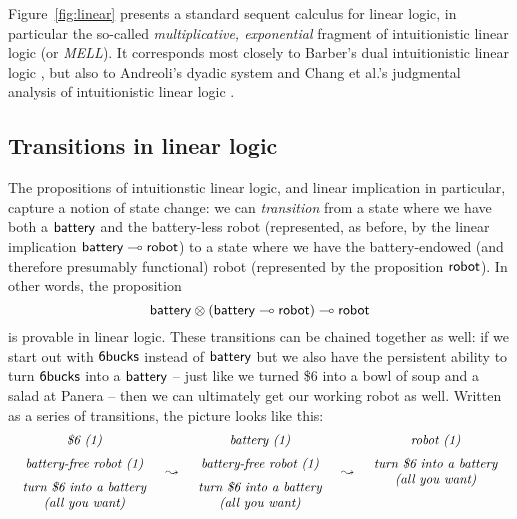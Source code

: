 

Figure~\ref{fig:linear} presents a standard sequent calculus for
linear logic, in particular the so-called {\it multiplicative,
  exponential} fragment of intuitionistic linear logic (or {\it
  MELL}). It corresponds most closely to Barber's dual intuitionistic
linear logic \cite{barber96dual}, but also to Andreoli's dyadic system
\cite{andreoli92logic} and Chang et al.'s judgmental analysis of
intuitionistic linear logic \cite{chang03judgmental}.

\subsection*{Transitions in linear logic}

The propositions of intuitionstic linear logic, and linear implication
in particular, capture a notion of state change: we can {\it
  transition} from a state where we have both a ${\sf battery}$ and
the battery-less robot (represented, as before, by the linear
implication ${\sf battery} \multimap {\sf robot}$) to a state where we
have the battery-endowed (and therefore presumably functional) robot
(represented by the proposition ${\sf robot}$). In other words, the
proposition
%
\[{\sf battery} \otimes ({\sf battery} \multimap {\sf robot}) \multimap
{\sf robot}\] 
%
is provable in linear logic. These transitions can be chained
together as well: if we start out with ${\sf
  6bucks}$ instead of ${\sf battery}$ but we also have the
persistent ability to turn ${\sf 6bucks}$ into a ${\sf battery}$ --
just like we turned \$6 into a bowl of soup and a salad at Panera --
then we can ultimately get our working robot as well.
Written as a series of transitions, the picture looks like this:
\[
\begin{array}{ccccc}
\begin{array}{c}
\mbox{\it \$6 (1)}\medskip\\ 
\mbox{\it battery-free robot (1)} \medskip\\ 
\mbox{\it turn \$6 into a battery}\\
\mbox{\it (all you want)}
\end{array}
& \leadsto &
\begin{array}{c}
\mbox{\it battery  (1)}\medskip\\ 
\mbox{\it battery-free robot (1)} \medskip\\ 
\mbox{\it turn \$6 into a battery}\\
\mbox{\it (all you want)}
\end{array}
& \leadsto &
\begin{array}{c}
\mbox{\it robot (1)} \medskip\\ 
\mbox{\it turn \$6 into a battery}\\
\mbox{\it (all you want)}\medskip\\~\\
\end{array}
\end{array}
\]
